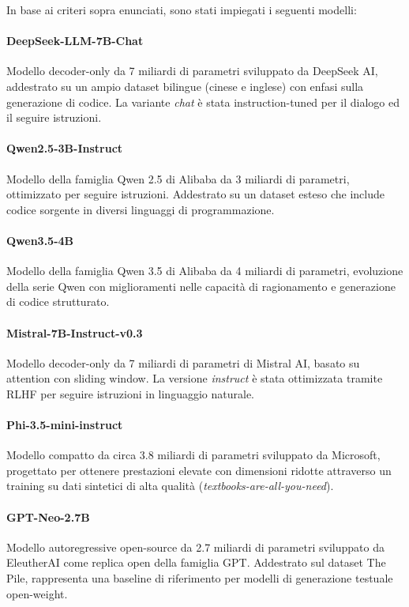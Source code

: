 \documentclass[final,5p,times,twocolumn]{elsarticle}
\begin{document}
In base ai criteri sopra enunciati, sono stati impiegati i seguenti modelli:

\paragraph{DeepSeek-LLM-7B-Chat} \citep{deepseek-llm} Modello decoder-only da 7 miliardi di parametri sviluppato da DeepSeek AI, addestrato su un ampio dataset bilingue (cinese e inglese) con enfasi sulla generazione di codice. La variante \textit{chat} è stata instruction-tuned per il dialogo ed il seguire istruzioni.

\paragraph{Qwen2.5-3B-Instruct} \citep{qwen2.5} Modello della famiglia Qwen 2.5 di Alibaba da 3 miliardi di parametri, ottimizzato per seguire istruzioni. Addestrato su un dataset esteso che include codice sorgente in diversi linguaggi di programmazione.

\paragraph{Qwen3.5-4B} \citep{qwen3.5} Modello della famiglia Qwen 3.5 di Alibaba da 4 miliardi di parametri, evoluzione della serie Qwen con miglioramenti nelle capacità di ragionamento e generazione di codice strutturato.

\paragraph{Mistral-7B-Instruct-v0.3} \citep{jiang2023mistral7b} Modello decoder-only da 7 miliardi di parametri di Mistral AI, basato su attention con sliding window. La versione \textit{instruct} è stata ottimizzata tramite RLHF per seguire istruzioni in linguaggio naturale.

\paragraph{Phi-3.5-mini-instruct} \citep{abdin2024phi3} Modello compatto da circa 3.8 miliardi di parametri sviluppato da Microsoft, progettato per ottenere prestazioni elevate con dimensioni ridotte attraverso un training su dati sintetici di alta qualità (\textit{textbooks-are-all-you-need}).

\paragraph{GPT-Neo-2.7B} \citep{gpt-neo} Modello autoregressive open-source da 2.7 miliardi di parametri sviluppato da EleutherAI come replica open della famiglia GPT. Addestrato sul dataset The Pile, rappresenta una baseline di riferimento per modelli di generazione testuale open-weight.
\end{document}
